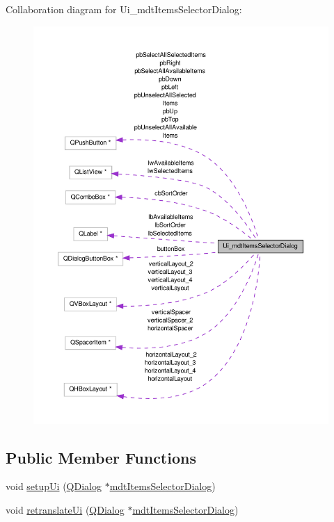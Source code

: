 Collaboration diagram for Ui\-\_\-mdt\-Items\-Selector\-Dialog\-:
\nopagebreak
\begin{figure}[H]
\begin{center}
\leavevmode
\includegraphics[width=350pt]{class_ui__mdt_items_selector_dialog__coll__graph}
\end{center}
\end{figure}
\subsection*{Public Member Functions}
\begin{DoxyCompactItemize}
\item 
void \hyperlink{class_ui__mdt_items_selector_dialog_adb513090c067d3f0a12bb03e54d3a086}{setup\-Ui} (\hyperlink{class_q_dialog}{Q\-Dialog} $\ast$\hyperlink{classmdt_items_selector_dialog}{mdt\-Items\-Selector\-Dialog})
\item 
void \hyperlink{class_ui__mdt_items_selector_dialog_ad6847c92e2b0c4a82cf2830ad9335b83}{retranslate\-Ui} (\hyperlink{class_q_dialog}{Q\-Dialog} $\ast$\hyperlink{classmdt_items_selector_dialog}{mdt\-Items\-Selector\-Dialog})
\end{DoxyCompactItemize}
